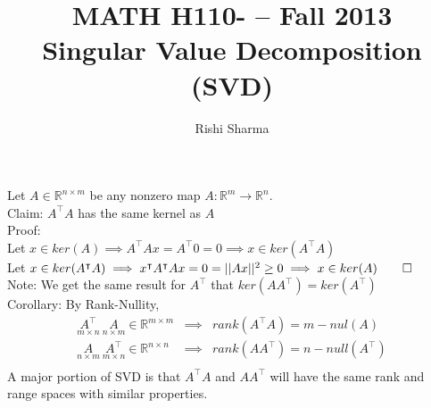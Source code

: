 \documentclass[11pt]{article}
\author{Rishi Sharma}
\title{MATH H110- -- Fall 2013\\  Singular Value Decomposition (SVD)}
\begin{document}
\maketitle

Let $A \in \mathbb{R}^{n \times m}$ be any nonzero map $A: \mathbb{R}^m \to \mathbb{R}^n$.\\

Claim: $A^\intercal A$ has the same kernel as $A$\\
Proof: \\\indent Let $x \in ker(A) \implies A^\intercal Ax = A^\intercal 0 = 0 \implies x \in ker(A^\intercal A)$\\\indent Let $x \in ker(A^\intercal A) \implies x^\intercal A^\intercal Ax = 0 = \vert\vert Ax \vert\vert^2 \geq 0 \implies x \in ker(A) \qed$\\

Note: We get the same result for $A^\intercal$ that $ker(AA^\intercal) = ker(A^\intercal)$\\

Corollary: By Rank-Nullity,
\begin{eqnarray*}
\underset{m \times n}{A^\intercal}\ \underset{n \times m}{A} \in \mathbb{R}^{m \times m} &\implies& rank(A^\intercal A) = m - nul(A)\\
\underset{n \times m}{A}\ \underset{m \times n}{A^\intercal} \in \mathbb{R}^{n \times n} &\implies& rank(AA^\intercal) = n - null(A^\intercal)\\
\end{eqnarray*}
A major portion of SVD is that $A^\intercal A$ and $AA^\intercal$ will have the same rank and range spaces with similar properties.\\
\end{document}

